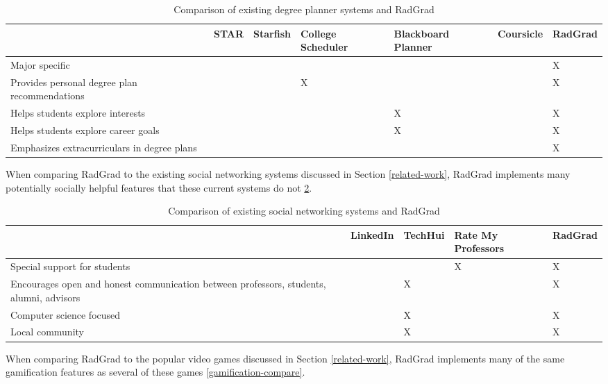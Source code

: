 \begin{table}[htbp!]
\centering
 \caption{Comparison of existing degree planner systems and RadGrad}
\begin{tabular}{ |p{3cm}|p{2cm}|p{2cm}|p{2cm}|p{2cm}|p{2cm}|p{2cm}| } 
  \hline
 \textbf{} & \textbf{STAR} & \textbf{Starfish} & \textbf{College Scheduler} & \textbf{Blackboard Planner}  & \textbf{Coursicle}  & \textbf{RadGrad} \\ 
  \hline
  Major specific & & & & & & X\\
  \hline
    Provides personal degree plan recommendations & & & X & & & X\\
  \hline
    Helps students explore interests & & & & X & & X\\
  \hline
    Helps students explore career goals & & & & X & & X\\
  \hline
    Emphasizes extracurriculars in degree plans & & & & & & X\\
  \hline

\end{tabular}
  \label{degree-compare}
\end{table}

When comparing RadGrad to the existing social networking systems discussed in Section \ref{related-work}, RadGrad implements many potentially socially helpful features that these current systems do not \ref{social-compare}. 

\begin{table}[htbp!]
\centering
 \caption{Comparison of existing social networking systems and RadGrad}
\begin{tabular}{ |p{8cm}|p{2cm}|p{2cm}|p{2cm}|p{2cm}| } 
  \hline
 \textbf{} & \textbf{LinkedIn} & \textbf{TechHui} & \textbf{Rate My Professors} &  \textbf{RadGrad} \\ 
  \hline
  Special support for students & & & X & X\\
  \hline
    Encourages open and honest communication between professors, students, alumni, advisors
 & & X & & X\\
  \hline
   Computer science focused & & X & & X\\
  \hline
  Local community & & X & & X\\
  \hline

\end{tabular}
 \label{social-compare}
\end{table}

When comparing RadGrad to the popular video games discussed in Section \ref{related-work}, RadGrad implements many of the same gamification features as several of these games \ref{gamification-compare}. 

